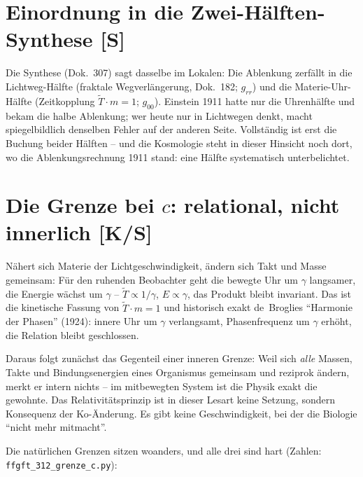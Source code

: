 \section{Einordnung in die Zwei-Hälften-Synthese [S]}

Die Synthese (Dok.~307) sagt dasselbe im Lokalen: Die Ablenkung
zerfällt in die Lichtweg-Hälfte (fraktale Wegverlängerung,
Dok.~182; $g_{rr}$) und die Materie-Uhr-Hälfte (Zeitkopplung
$\tilde T \cdot m = 1$; $g_{00}$). Einstein 1911 hatte nur die
Uhrenhälfte und bekam die halbe Ablenkung; wer heute nur in
Lichtwegen denkt, macht spiegelbildlich denselben Fehler auf der
anderen Seite. Vollständig ist erst die Buchung beider Hälften --
und die Kosmologie steht in dieser Hinsicht noch dort, wo die
Ablenkungsrechnung 1911 stand: eine Hälfte systematisch
unterbelichtet.

\section{Die Grenze bei $c$: relational, nicht innerlich [K/S]}

Nähert sich Materie der Lichtgeschwindigkeit, ändern sich Takt und
Masse gemeinsam: Für den ruhenden Beobachter geht die bewegte Uhr
um $\gamma$ langsamer, die Energie wächst um $\gamma$ --
$\tilde T \propto 1/\gamma$, $E \propto \gamma$, das Produkt bleibt
invariant. Das ist die kinetische Fassung von
$\tilde T \cdot m = 1$ und historisch exakt de~Broglies
\enquote{Harmonie der Phasen} (1924): innere Uhr um $\gamma$
verlangsamt, Phasenfrequenz um $\gamma$ erhöht, die Relation bleibt
geschlossen.

Daraus folgt zunächst das Gegenteil einer inneren Grenze: Weil sich
\emph{alle} Massen, Takte und Bindungsenergien eines Organismus
gemeinsam und reziprok ändern, merkt er intern nichts -- im
mitbewegten System ist die Physik exakt die gewohnte. Das
Relativitätsprinzip ist in dieser Lesart keine Setzung, sondern
Konsequenz der Ko-Änderung. Es gibt keine Geschwindigkeit, bei der
die Biologie \enquote{nicht mehr mitmacht}.

Die natürlichen Grenzen sitzen woanders, und alle drei sind hart
(Zahlen: \texttt{ffgft\_312\_grenze\_c.py}):

